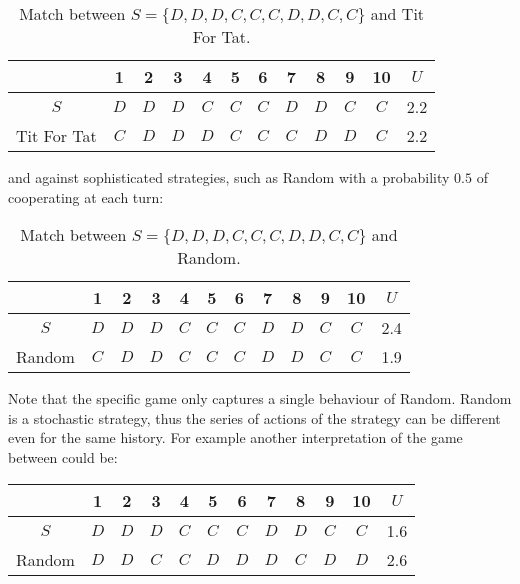 \begin{table}[htb]
\centering
\begin{tabular}{cccccccccccc}
    & \textbf{1} & \textbf{2} & \textbf{3} & \textbf{4}  & \textbf{5} & \textbf{6} & \textbf{7} & \textbf{8}  & \textbf{9} & \textbf{10} & \(U\) \\ \midrule
    \(S\) & \(D\) & \(D\) & \(D\) & \(C\) & \(C\) & \(C\) & \(D\) & \(D\) & \(C\) & \(C\) & 2.2 \\
    Tit For Tat & \(C\) & \(D\) & \(D\) & \(D\) & \(C\) & \(C\) & \(C\) & \(D\) & \(D\) & \(C\) & 2.2 \\ \bottomrule
\end{tabular}
\caption{Match between \(S = \{D, D, D, C, C, C, D, D, C, C\}\) and Tit For Tat.}\label{table:s_vs_tft}
\end{table}

and against sophisticated strategies, such as Random with a probability \(0.5\) of
cooperating at each turn:

\begin{table}[htb]
\centering
\begin{tabular}{cccccccccccc}
    & \textbf{1} & \textbf{2} & \textbf{3} & \textbf{4}  & \textbf{5} & \textbf{6} & \textbf{7} & \textbf{8}  & \textbf{9} & \textbf{10} & \(U\) \\ \midrule
    \(S\) & \(D\) & \(D\) & \(D\) & \(C\) & \(C\) & \(C\) & \(D\) & \(D\) & \(C\) & \(C\) & 2.4 \\
    Random & \(C\) & \(D\) & \(D\) & \(C\) & \(C\) & \(C\) & \(D\) & \(D\) & \(C\) & \(C\) & 1.9 \\ \bottomrule
\end{tabular}
\caption{Match between \(S = \{D, D, D, C, C, C, D, D, C, C\}\) and Random.}\label{table:s_vs_random}
\end{table}

Note that the specific game only captures a single behaviour of Random. Random
is a stochastic strategy, thus the series of actions of the strategy can be
different even for the same history. For example another interpretation of the
game between could be:

\begin{table}[htb]
    \centering
    \begin{tabular}{cccccccccccc}
        & \textbf{1} & \textbf{2} & \textbf{3} & \textbf{4}  & \textbf{5} & \textbf{6} & \textbf{7} & \textbf{8}  & \textbf{9} & \textbf{10} & \(U\) \\ \midrule
        \(S\) & \(D\) & \(D\) & \(D\) & \(C\) & \(C\) & \(C\) & \(D\) & \(D\) & \(C\) & \(C\) & 1.6 \\
        Random & \(D\) &\(D\) &\(C\) &\(C\) &\(D\) &\(D\) &\(D\) &\(C\) &\(D\) &\(D\) & 2.6 \\ \bottomrule
    \end{tabular}
\end{table}

